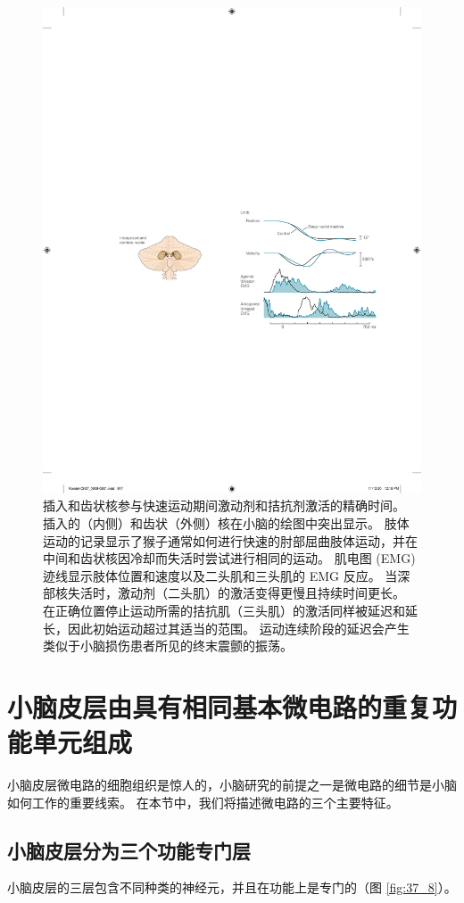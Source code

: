\begin{figure}[htbp]
	\centering
	\includegraphics[width=0.5\linewidth]{chap37/fig_37_7}
	\caption{插入和齿状核参与快速运动期间激动剂和拮抗剂激活的精确时间。 插入的（内侧）和齿状（外侧）核在小脑的绘图中突出显示。 肢体运动的记录显示了猴子通常如何进行快速的肘部屈曲肢体运动，并在中间和齿状核因冷却而失活时尝试进行相同的运动。 肌电图 (EMG) 迹线显示肢体位置和速度以及二头肌和三头肌的 EMG 反应。 当深部核失活时，激动剂（二头肌）的激活变得更慢且持续时间更长。 在正确位置停止运动所需的拮抗肌（三头肌）的激活同样被延迟和延长，因此初始运动超过其适当的范围。 运动连续阶段的延迟会产生类似于小脑损伤患者所见的终末震颤的振荡。}
	\label{fig:37_7}
\end{figure}

\section{小脑皮层由具有相同基本微电路的重复功能单元组成}
小脑皮层微电路的细胞组织是惊人的，小脑研究的前提之一是微电路的细节是小脑如何工作的重要线索。 在本节中，我们将描述微电路的三个主要特征。

\subsection{小脑皮层分为三个功能专门层}
小脑皮层的三层包含不同种类的神经元，并且在功能上是专门的（图 \ref{fig:37_8}）。

